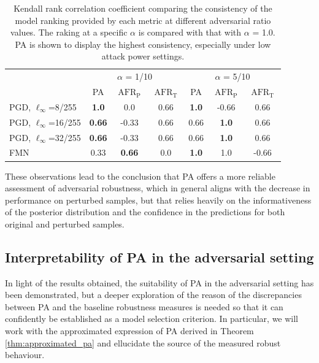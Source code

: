 \begin{table}[h]
    \centering
    \begin{tabular}{l|ccc|ccc}
    \multirow{2}{*}{} & \multicolumn{3}{c|}{$\alpha$ = 1/10} & \multicolumn{3}{c}{$\alpha$ = 5/10} \\
     & PA & $\operatorname{AFR}_{\text{P}}$ & $\operatorname{AFR}_{\text{T}}$ & PA & $\operatorname{AFR}_{\text{P}}$  & $\operatorname{AFR}_{\text{T}}$ \\
    \midrule
    PGD, $\ell_\infty$=8/255 & \textbf{1.0} & 0.0 & 0.66  & \textbf{1.0} & -0.66 & 0.66  \\  
    PGD, $\ell_\infty$=16/255 & \textbf{0.66} & -0.33 & 0.66 & 0.66  & \textbf{1.0} & 0.66 \\  
    PGD, $\ell_\infty$=32/255 & \textbf{0.66} & -0.33 & 0.66  & 0.66 & \textbf{1.0} & 0.66  \\  
    FMN & 0.33 & \textbf{0.66} & 0.0  & \textbf{1.0} & 1.0 & -0.66  \\  
    \bottomrule
    \end{tabular}
    \caption{
        Kendall rank correlation coefficient comparing the consistency of the model ranking
        provided by each metric at different adversarial ratio values. The raking at a specific $\alpha$ is 
        compared with that with $\alpha$ = 1.0. PA is shown to display the highest consistency, especially under
        low attack power settings.
    }
    \label{tab:kendall_comparison_table}
\end{table}

These observations lead to the conclusion that PA offers a more reliable
assessment of adversarial robustness, which in general aligns with the decrease
in performance on perturbed samples, but that relies heavily on the informativeness
of the posterior distribution and the confidence in the predictions for both
original and perturbed samples. \\

\subsection{Interpretability of PA in the adversarial setting}

In light of the results obtained, the suitability of
PA in the adversarial setting has been demonstrated, but a deeper exploration of the
reason of the discrepancies between PA and the baseline robustness measures is needed
so that it can confidently be established as a model selection criterion. In particular,
we will work with the approximated expression of PA derived in Theorem \ref{thm:approximated_pa} 
and ellucidate the source of the measured robust behaviour. \\

